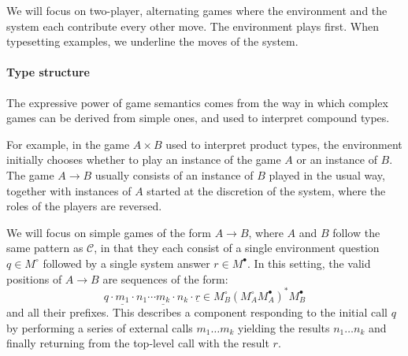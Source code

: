 \documentclass[sigplan,10pt,review,anonymous]{acmart}\settopmatter{printfolios=true,printccs=false,printacmref=false}
\newcommand{\kw}[1]{\ensuremath{ \mathsf{#1} }}
\newcommand{\que}{\circ}
\newcommand{\ans}{\bullet}
\begin{document}
We will focus on two-player, alternating games
where the environment and the system each contribute every other move.
The environment plays first.
When typesetting examples,
we underline the moves of the system.



\paragraph{Type structure} \label{sec:mainideas:gs:types} %

The expressive power of game semantics
comes from the way in which complex games can be derived from simple ones,
and used to interpret compound types.

For example,
in the game $A \times B$ used to interpret product types,
the environment initially chooses whether to play
an instance of the game $A$ or an instance of $B$.
The game $A \rightarrow B$ usually consists of
an instance of $B$ played in the usual way,
together with instances of $A$
started at the discretion of the system,
where the roles of the players are reversed.

We will focus on simple games of the form $A \rightarrow B$,
where $A$ and $B$ follow the same pattern as $\mathcal{C}$,
in that they each consist of a single environment question
$q \in M^\que$
followed by a single system answer
$r \in M^\ans$.
In this setting,
the valid positions of $A \rightarrow B$ are
sequences of the form:
\[
  q \cdot \underline{m_1} \cdot n_1 \cdots
          \underline{m_k} \cdot n_k \cdot \underline{r} \in
  M_B^\que ( {M_A^\que} M_A^\ans )^* {M_B^\ans}
\]
and all their prefixes.
This describes a component responding to
the initial call $q$ by
performing a series of external calls $m_1 \ldots m_k$
yielding the results $n_1 \ldots n_k$
and finally returning from the top-level call
with the result $r$.


\end{document}
